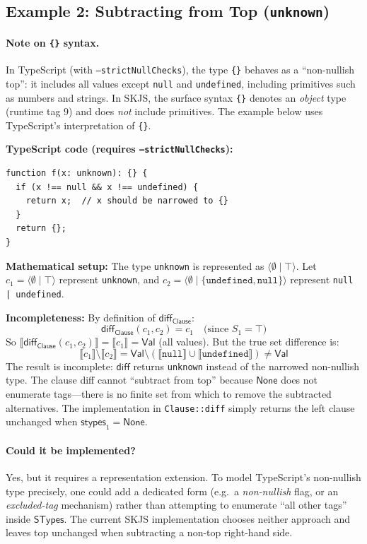 \documentclass[11pt]{article}
\newcommand{\sem}[1]{\llbracket #1 \rrbracket}
\newcommand{\diff}{\mathsf{diff}}
\newcommand{\Clause}{\mathsf{Clause}}
\newcommand{\STypes}{\mathsf{STypes}}
\newcommand{\stypes}{\mathsf{stypes}}
\newcommand{\Val}{\mathsf{Val}}
\newcommand{\clause}[2]{\langle #1 \mid #2 \rangle}
\begin{document}
\subsection{Example 2: Subtracting from Top (\texttt{unknown})}

\paragraph{Note on \texttt{\{\}} syntax.}
In TypeScript (with \texttt{--strictNullChecks}), the type \texttt{\{\}} behaves as a ``non-nullish top'': it includes all values except \texttt{null} and \texttt{undefined}, including primitives such as numbers and strings.
In SKJS, the surface syntax \texttt{\{\}} denotes an \emph{object} type (runtime tag $9$) and does \emph{not} include primitives.
The example below uses TypeScript's interpretation of \texttt{\{\}}.

\medskip
\textbf{TypeScript code (requires \texttt{--strictNullChecks}):}
\begin{verbatim}
function f(x: unknown): {} {
  if (x !== null && x !== undefined) {
    return x;  // x should be narrowed to {}
  }
  return {};
}
\end{verbatim}

\textbf{Mathematical setup:}
The type \texttt{unknown} is represented as $\clause{\emptyset}{\top}$.
Let $c_1 = \clause{\emptyset}{\top}$ represent \texttt{unknown}, and $c_2 = \clause{\emptyset}{\{\texttt{undefined}, \texttt{null}\}}$ represent \texttt{null | undefined}.

\textbf{Incompleteness:}
By definition of $\diff_{\Clause}$:
\[
\diff_{\Clause}(c_1, c_2) = c_1 \quad \text{(since } S_1 = \top\text{)}
\]
So $\sem{\diff_{\Clause}(c_1, c_2)} = \sem{c_1} = \Val$ (all values).
But the true set difference is:
\[
\sem{c_1} \setminus \sem{c_2} = \Val \setminus (\sem{\texttt{null}} \cup \sem{\texttt{undefined}}) \neq \Val
\]
The result is incomplete: $\diff$ returns \texttt{unknown} instead of the narrowed non-nullish type.
The clause diff cannot ``subtract from top'' because $\mathsf{None}$ does not enumerate tags---there is no finite set from which to remove the subtracted alternatives.
The implementation in \texttt{Clause::diff} simply returns the left clause unchanged when $\stypes_1 = \mathsf{None}$.

\paragraph{Could it be implemented?}
Yes, but it requires a representation extension.
To model TypeScript's non-nullish type precisely, one could add a dedicated form (e.g.\ a \emph{non-nullish} flag, or an \emph{excluded-tag} mechanism) rather than attempting to enumerate ``all other tags'' inside \(\STypes\).
The current SKJS implementation chooses neither approach and leaves top unchanged when subtracting a non-top right-hand side.
\end{document}

